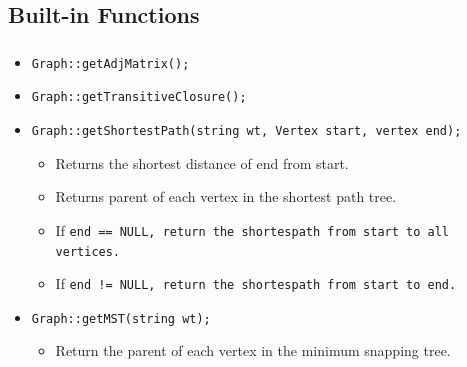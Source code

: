 \documentclass[mathserif,10pt]{beamer}
\begin{document}
\frame
{
  \begin{figure}[h]
  \centering
  \end{figure}
}

\frame
{
  \frametitle{\subsecname}
  \lstdfs
}

\subsection{Built-in Functions}
\frame
{
  \frametitle{\subsecname}
  \begin{itemize}
    \item \tt{Graph::getAdjMatrix();}
    \item \tt{Graph::getTransitiveClosure();}
    \item \tt{Graph::getShortestPath(string wt, Vertex start, vertex end);}
    \begin{itemize}
      \item Returns the shortest distance of end from start. 
      \item Returns parent of each vertex in the shortest path tree.
      \item If \tt{end == NULL}, return the shortespath from start to all vertices.
      \item If \tt{end != NULL}, return the shortespath from start to end.
    \end{itemize} 
    \item \tt{Graph::getMST(string wt);}
    \begin{itemize}
      \item Return the parent of each vertex in the minimum snapping tree.
    \end{itemize} 
  \end{itemize}
}
\end{document}
